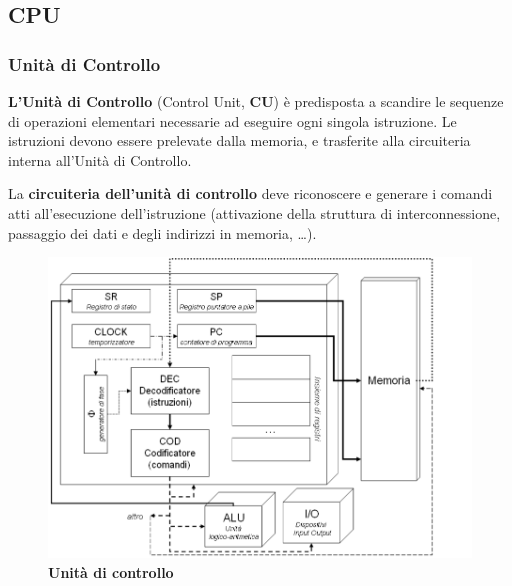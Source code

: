 \documentclass[12pt]{article} %
\begin{document}
\subsection{CPU}
\subsubsection{Unità di Controllo}
\textbf{L’Unità di Controllo} (Control Unit, \textbf{CU}) è predisposta a scandire le sequenze di operazioni elementari necessarie ad eseguire ogni singola istruzione. Le istruzioni devono essere prelevate dalla memoria, e trasferite alla circuiteria interna all’Unità di Controllo.\par\medskip\noindent
La \textbf{circuiteria dell’unità di controllo} deve riconoscere e generare i comandi atti all’esecuzione dell’istruzione (attivazione della struttura di interconnessione, passaggio dei dati e degli indirizzi in memoria, …). 
\begin{figure}[h]
    \centering
    \includegraphics[width=0.75\linewidth]{image1.png}
    \caption{\textbf{Unità di controllo}}
\end{figure}
\end{document}
